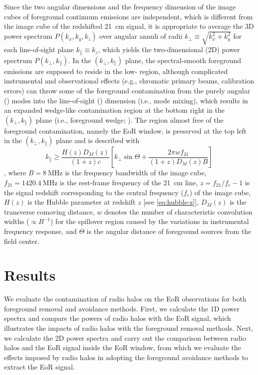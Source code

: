\documentclass[twocolumn]{aastex62}
\newcommand{\klos}{\text{$k_{\parallel}$}}
\newcommand{\kperp}{\text{$k_{\bot}$}}
\begin{document}
Since the two angular dimensions and the frequency dimension of the image
cubes of foreground continuum emissions are independent, which is
different from the image cube of the redshifted 21~cm signal, it is
appropriate to average the 3D power spectrum $P(k_x, k_y, k_z)$
over angular annuli of radii $\kperp \equiv \sqrt{k_x^2 + k_y^2}$
for each line-of-sight plane $\klos \equiv k_z$, which yields the
two-dimensional (2D) power spectrum $P(\kperp, \klos)$.
In the $(\kperp, \klos)$ plane, the spectral-smooth foreground emissions
are supposed to reside in the low-\klos{} region, although complicated
instrumental and observational effects (e.g., chromatic primary beams,
calibration errors) can throw some of the foreground contamination from
the purely angular (\kperp) modes into the line-of-sight (\klos)
dimension (i.e., mode mixing), which results in an expanded wedge-like
contamination region at the bottom right in the $(\kperp, \klos)$ plane
(i.e., foreground wedge; \citealt{datta2010,morales2012,liu2014}).
The region almost free of the foreground contamination, namely the
EoR window, is preserved at the top left in the $(\kperp, \klos)$ plane
and is described with
\begin{equation}
  \label{eq:eor-window}
  \klos \geq \frac{H(z) D_{\!M}(z)}{(1+z) c} \left[
    \kperp \sin\Theta + \frac{2\pi w f_{21}}{(1+z) D_{\!M}(z) B} \right]
\end{equation}
\citep{thyagarajan2013},
where
$B = \SI{8}{\MHz}$ is the frequency bandwidth of the image cube,
$f_{21} = \SI{1420.4}{\MHz}$ is the rest-frame frequency of the 21~cm line,
$z = f_{21}/f_c - 1$ is the signal redshift corresponding to the central
frequency ($f_c$) of the image cube,
$H(z)$ is the Hubble parameter at redshift $z$ [see \autoref{eq:hubble-z}],
$D_{\!M}(z)$ is the transverse comoving distance,
$w$ denotes the number of characteristic convolution widths
($\propto B^{-1}$) for the spillover region caused by the variations in
instrumental frequency response,
and $\Theta$ is the angular distance of foreground sources from the
field center.


\section{Results}
\label{sec:results}

We evaluate the contamination of radio halos on the EoR observations for
both foreground removal and avoidance methods.
First, we calculate the 1D power spectra and compare the powers of
radio halos with the EoR signal, which illustrates the impacts of radio
halos with the foreground removal methods.
Next, we calculate the 2D power spectra and carry out the comparison
between radio halos and the EoR signal inside the EoR window, from
which we evaluate the effects imposed by radio halos in adopting the
foreground avoidance methods to extract the EoR signal.
\end{document}
